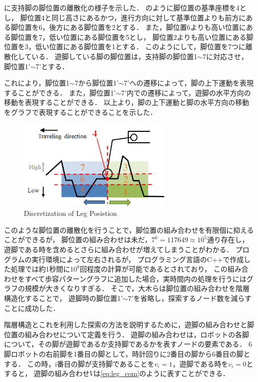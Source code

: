 に支持脚の脚位置の離散化の様子を示した．
のように脚位置の基準座標を4とし，
脚位置4と同じ高さにあるかつ，進行方向に対して基準位置よりも前方にある脚位置を6，後方にある脚位置を2とする．
また，脚位置6よりも高い位置にある脚位置を7，低い位置にある脚位置を5とし，
脚位置2よりも高い位置にある脚位置を3，低い位置にある脚位置を1とする．
このようにして，脚位置を7つに離散化している．
遊脚している脚の脚位置は，支持脚の脚位置1$\sim$7に対応させ，脚位置1'$\sim$7'とする．%

これにより，脚位置1$\sim$7から脚位置1'$\sim$7'への遷移によって，脚の上下運動を表現することができる．
また，脚位置1'$\sim$7'内での遷移によって，遊脚の水平方向の移動を表現することができる．
以上より，脚の上下運動と脚の水平方向の移動をグラフで表現することができることを示した．

\begin{figure}[b]
  \begin{center}
    \includegraphics[width=75mm, clip]{figure/chapter2/discretization_of_leg_pos.png}
    \caption{Discretization of Leg Posistion}
    \label{fig:discretization} %
  \end{center}
\end{figure}

このような脚位置の離散化を行うことで，脚位置の組み合わせを有限個に抑えることができるが，
脚位置の組み合わせは未だ，$7^6 = 117649 \approx 10^5$通り存在し，
遊脚である時を含めるとさらに組み合わせが増えてしまうことがわかる．
プログラムの実行環境によって左右されるが，
プログラミング言語のC++で作成した処理では約1秒間に$10^8$回程度の計算が可能であるとされており\cite{Program_Challenge_Book}，
この組み合わせをすべて歩容パターングラフに追加した場合，実時間内の処理を行うにはグラフの規模が大きくなりすぎる．
そこで，大木らは脚位置の組み合わせを階層構造化することで，
遊脚時の脚位置1'$\sim$7'を省略し，探索するノード数を減らすことに成功した\cite{Oki_Graph_search}．

階層構造とこれを利用した探索の方法を説明するために，遊脚の組み合わせと脚位置の組み合わせについて定義を行う．
遊脚の組み合わせは，ロボットの各脚について，その脚が遊脚であるか支持脚であるかを表すノードの要素である．
6脚ロボットの右前脚を1番目の脚として，時計回りに2番目の脚から6番目の脚とする．
この時，i番目の脚が支持脚であることを$v_i = 1$，遊脚である時を$v_i = 0$とすると，
遊脚の組み合わせ$V$は\eqref{eq:leg_com}のように表すことができる．

